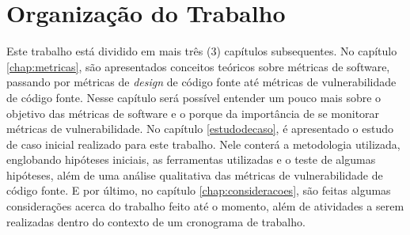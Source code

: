 \section{Organização do Trabalho}

Este trabalho está dividido em mais três (3) capítulos subsequentes. No capítulo
\ref{chap:metricas}, são apresentados conceitos teóricos sobre métricas de
software, passando por métricas de \textit{design} de código fonte até métricas de 
vulnerabilidade de código fonte. Nesse capítulo será possível entender um pouco mais 
sobre o objetivo das métricas de software e o porque da importância de se monitorar
métricas de vulnerabilidade. No capítulo \ref{estudodecaso}, é apresentado o
estudo de caso inicial realizado para este trabalho. Nele conterá a metodologia
utilizada, englobando hipóteses iniciais, as ferramentas utilizadas e o teste de
algumas hipóteses, além de uma análise qualitativa das métricas de
vulnerabilidade de código fonte. E por último, no capítulo
\ref{chap:consideracoes}, são feitas algumas considerações acerca do trabalho
feito até o momento, além de atividades a serem realizadas dentro do contexto de
um cronograma de trabalho.

